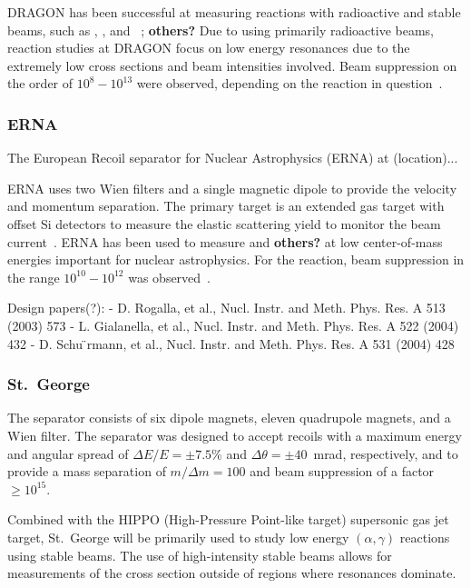 DRAGON has been successful at measuring reactions with radioactive and stable
beams, such as ,
, and
~\cite{Engel2005}; \textbf{others?}
Due to using primarily radioactive beams, reaction studies at DRAGON focus on
low energy resonances due to the extremely low cross sections and beam
intensities involved. Beam suppression on the order of $10^{8} - 10^{13}$ were
observed, depending on the reaction in question~\cite{Engel2005}.

\subsubsection{ERNA}
The European Recoil separator for Nuclear Astrophysics (ERNA) at (location)...

ERNA uses two Wien filters and a single magnetic dipole to provide the velocity
and momentum separation. The primary target is an extended gas target with
offset Si detectors to measure the elastic scattering yield to monitor the
beam current~\cite{DiLeva2008}. ERNA has been used to measure
 and \textbf{others?} at low
center-of-mass energies important for nuclear astrophysics. For the
 reaction, beam suppression
in the range $10^{10} - 10^{12}$ was observed~\cite{DiLeva2008}.

Design papers(?):
- D. Rogalla, et al., Nucl. Instr. and Meth. Phys. Res. A 513 (2003) 573
- L. Gialanella, et al., Nucl. Instr. and Meth. Phys. Res. A 522 (2004) 432
- D. Schu ̈rmann, et al., Nucl. Instr. and Meth. Phys. Res. A 531 (2004) 428

\subsubsection{St.\ George}
The separator consists of six dipole magnets, eleven quadrupole magnets, and a
Wien filter. The separator was designed to accept recoils with a maximum
energy and angular spread of $\Delta E/E = \pm7.5\%$ and
$\Delta\theta = \pm40$~mrad, respectively, and to provide a mass separation
of $m/\Delta m = 100$ and beam suppression of a factor $\geq 10^{15}$.

Combined with the HIPPO (High-Pressure Point-like target) supersonic gas jet
target, St.\ George will be primarily used to study low energy
$(\alpha,\gamma)$ reactions using stable beams. The use of high-intensity
stable beams allows for measurements of the cross section outside of regions
where resonances dominate.
